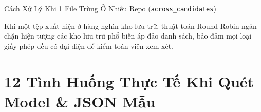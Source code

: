\documentclass[aspectratio=169, xcolor=table]{beamer}
\begin{document}
\begin{frame}{Cách Xử Lý Khi 1 File Trùng Ở Nhiều Repo (\texttt{across\_candidates})}
\begin{center}
{
    }
    \end{center}
    \vspace{-0.2cm}
    \begin{infobox}
        \scriptsize
        Khi một tệp xuất hiện ở hàng nghìn kho lưu trữ, thuật toán Round-Robin ngăn chặn hiện tượng các kho lưu trữ phổ biến áp đảo danh sách, bảo đảm mọi loại giấy phép đều có đại diện để kiểm toán viên xem xét.
    \end{infobox}
\end{frame}

\section{12 Tình Huống Thực Tế Khi Quét Model \& JSON Mẫu}
\end{document}
